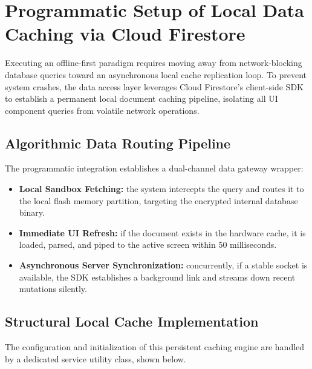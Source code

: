 \documentclass[12pt,a4paper,oneside]{report}
\begin{document}
\section{Programmatic Setup of Local Data Caching via Cloud Firestore}

Executing an offline-first paradigm requires moving away from network-blocking database
queries toward an asynchronous local cache replication loop. To prevent system crashes,
the data access layer leverages Cloud Firestore's client-side SDK to establish a permanent
local document caching pipeline, isolating all UI component queries from volatile network
operations.

\subsection{Algorithmic Data Routing Pipeline}

The programmatic integration establishes a dual-channel data gateway wrapper:

\begin{itemize}[leftmargin=1.4em]
  \item \textbf{Local Sandbox Fetching:} the system intercepts the query and routes it to
        the local flash memory partition, targeting the encrypted internal database binary.
  \item \textbf{Immediate UI Refresh:} if the document exists in the hardware cache, it is
        loaded, parsed, and piped to the active screen within 50 milliseconds.
  \item \textbf{Asynchronous Server Synchronization:} concurrently, if a stable socket is
        available, the SDK establishes a background link and streams down recent mutations
        silently.
\end{itemize}

\subsection{Structural Local Cache Implementation}

The configuration and initialization of this persistent caching engine are handled by a
dedicated service utility class, shown below.
\end{document}
